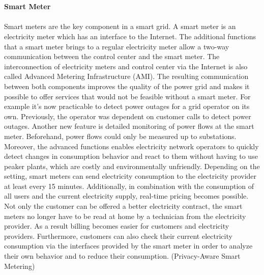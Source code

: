 \\
\\
\textbf{Smart Meter}
\\
\\
Smart meters are the key component in a smart grid. A smart meter is an electricity meter which has an interface to the Internet. The additional functions that a smart meter brings to a regular electricity meter allow a two-way communication between the control center and the smart meter. The interconnection of electricity meters and control center via the Internet is also called Advanced Metering Infrastructure (AMI). The resulting communication between both components improves the quality of the power grid and makes it possible to offer services that would not be feasible without a smart meter. For example it's now practicable to detect power outages for a grid operator on its own.%
Previously, the operator was dependent on customer calls to detect power outages. Another new feature is detailed monitoring of power flows at the smart meter. Beforehand, power flows could only be measured up to substations. Moreover, the advanced functions enables electricity network operators to quickly detect changes in consumption behavior and react to them without having to use peaker plants, which are costly and environmentally unfriendly. Depending on the setting, smart meters can send electricity consumption to the electricity provider at least every 15 minutes. Additionally, in combination with the consumption of all users and the current electricity supply, real-time pricing becomes possible. Not only the customer can be offered a better electricity contract, the smart meters no longer have to be read at home by a technician from the electricity provider. As a result billing becomes easier for customers and electricity providers. Furthermore, customers can also check their current electricity consumption via the interfaces provided by the smart meter in order to analyze their own behavior and to reduce their consumption. (Privacy-Aware Smart Metering)
